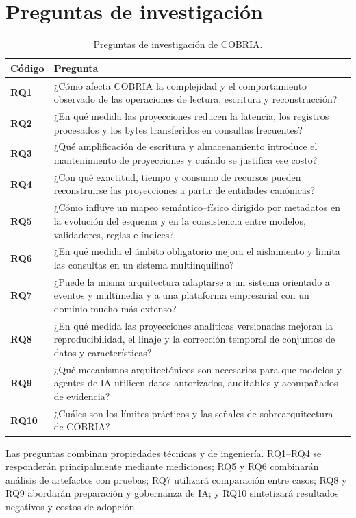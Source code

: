 \section{Preguntas de investigación}

\begin{table}[H]
\centering
\caption{Preguntas de investigación de COBRIA.}
\label{tab:preguntas}
\begin{tabularx}{\textwidth}{>{\bfseries}p{1.6cm}X}
\toprule
Código & Pregunta \\
\midrule
RQ1 & ¿Cómo afecta COBRIA la complejidad y el comportamiento observado de las
operaciones de lectura, escritura y reconstrucción? \\
RQ2 & ¿En qué medida las proyecciones reducen la latencia, los registros procesados y
los bytes transferidos en consultas frecuentes? \\
RQ3 & ¿Qué amplificación de escritura y almacenamiento introduce el mantenimiento de
proyecciones y cuándo se justifica ese costo? \\
RQ4 & ¿Con qué exactitud, tiempo y consumo de recursos pueden reconstruirse las
proyecciones a partir de entidades canónicas? \\
RQ5 & ¿Cómo influye un mapeo semántico--físico dirigido por metadatos en la evolución
del esquema y en la consistencia entre modelos, validadores, reglas e índices? \\
RQ6 & ¿En qué medida el ámbito obligatorio mejora el aislamiento y limita las consultas
en un sistema multiinquilino? \\
RQ7 & ¿Puede la misma arquitectura adaptarse a un sistema orientado a eventos y
multimedia y a una plataforma empresarial con un dominio mucho más extenso? \\
RQ8 & ¿En qué medida las proyecciones analíticas versionadas mejoran la
reproducibilidad, el linaje y la corrección temporal de conjuntos de datos y características? \\
RQ9 & ¿Qué mecanismos arquitectónicos son necesarios para que modelos y agentes de IA
utilicen datos autorizados, auditables y acompañados de evidencia? \\
RQ10 & ¿Cuáles son los límites prácticos y las señales de sobrearquitectura de COBRIA? \\
\bottomrule
\end{tabularx}
\end{table}

Las preguntas combinan propiedades técnicas y de ingeniería. RQ1--RQ4 se responderán
principalmente mediante mediciones; RQ5 y RQ6 combinarán análisis de artefactos con
pruebas; RQ7 utilizará comparación entre casos; RQ8 y RQ9 abordarán preparación y
gobernanza de IA; y RQ10 sintetizará resultados negativos y costos de adopción.

